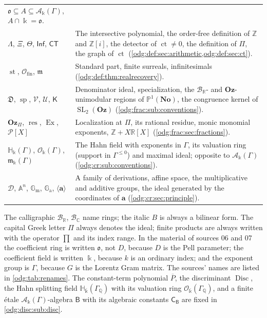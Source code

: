 \documentclass[11pt,oneside]{article}
\numberwithin{equation}{section}
\theoremstyle{definition}
\theoremstyle{remark}
\newcommand{\No}{\mathbf{No}}
\newcommand{\Oz}{\mathbf{Oz}}
\newcommand{\Z}{\mathbb Z}
\newcommand{\Q}{\mathbb Q}
\newcommand{\R}{\mathbb R}
\newcommand{\C}{\mathbb C}
\newcommand{\BR}{\mathcal B_{\R}}
\newcommand{\BC}{\mathcal B_{\C}}
\newcommand{\ct}{\operatorname{ct}}
\newcommand{\SL}{\operatorname{SL}}
\newcommand{\st}{\operatorname{st}}
\newcommand{\Ofin}{\mathcal O_{\mathrm{fin}}}
\newcommand{\Den}{\mathfrak D}
\newcommand{\spz}{\operatorname{sp}}
\newcommand{\res}{\operatorname{res}}
\newcommand{\Ex}{\operatorname{Ex}}
\newcommand{\Vreg}{\mathcal V}
\newcommand{\Ureg}{\mathcal U}
\newcommand{\Kcong}{\mathsf K}
\newcommand{\Pmod}{\mathcal P}
\newcommand{\crH}{\mathbb H_\Bbbk(\Gamma)}
\newcommand{\crA}{\mathcal A_\Bbbk(\Gamma)}
\newcommand{\crO}{\mathcal O_\Bbbk(\Gamma)}
\newcommand{\crm}{\mathfrak m_\Bbbk(\Gamma)}
\newcommand{\Aff}{\mathbb A}
\newcommand{\Gm}{\mathbb G_{\mathrm m}}
\newcommand{\Ga}{\mathbb G_{\mathrm a}}
\newcommand{\Disc}{\operatorname{Disc}}
\newcommand{\Hbar}{\mathbb H_{\bar\Bbbk}(\Gamma_\Q)}
\newcommand{\Obar}{\mathcal O_{\bar\Bbbk}(\Gamma_\Q)}
\begin{document}
\begin{center}
\begin{tabular}{>{\raggedright\arraybackslash}p{}>{\raggedright\arraybackslash}p{}}
$\mathfrak o\subseteq A\subseteq\mathcal A_\Bbbk(\Gamma)$, $A\cap\Bbbk=\mathfrak o$.\\
$\Lambda$, $\Xi$, $\Theta$, $\mathsf{Inf}$, $\mathsf{CT}$ & The intersective
polynomial, the order-free definition of $\Z$ and $\Z[i]$, the detector of
$\ct\ne0$, the definition of $\Pi$, the graph of $\ct$
(\cref{odg:def:sec:arithmetic,odg:def:sec:ct}).\\
$\st$, $\Ofin$, $\mathfrak m$ & Standard part, finite surreals, infinitesimals
(\cref{odg:def:thm:realrecovery}).\\
$\Den$, $\spz$, $\Vreg$, $\Ureg$, $\Kcong$ & Denominator ideal, specialization,
the $\BR$- and $\Oz$-unimodular regions of $\mathbb P^1(\No)$, the congruence
kernel of $\SL_2(\Oz)$ (\cref{odg:frac:sub:conventions}).\\
$\Oz_\Pi$, $\res$, $\Ex$, $\Pmod[X]$ & Localization at $\Pi$, its rational
residue, monic monomial exponents, $\Z+X\R[X]$ (\cref{odg:frac:sec:fractions}).\\
$\crH$, $\crO$, $\crm$ & The Hahn field with exponents in $\Gamma$, its valuation
ring (support in $\Gamma^{\le0}$) and maximal ideal; opposite to $\crA$
(\cref{odg:cr:sub:conventions}).\\
$\mathcal D$, $\Aff^n$, $\Gm$, $\Ga$, $\langle\mathbf a\rangle$ & A family of
derivations, affine space, the multiplicative and additive groups, the ideal generated
by the coordinates of $\mathbf a$ (\cref{odg:cr:sec:principle}).\\
\bottomrule
\end{tabular}
\end{center}

The calligraphic $\BR$, $\BC$ name rings; the italic $B$ is always a bilinear
form. The capital Greek letter $\Pi$ always denotes the ideal; finite products
are always written with the operator $\prod$ and its index range. In the
material of sources 06 and 07 the coefficient ring is written $\mathfrak o$,
not $D$, because $D$ is the Pell parameter; the coefficient field is written
$\Bbbk$, because $k$ is an ordinary index; and the exponent group is $\Gamma$,
because $G$ is the Lorentz Gram matrix. The sources' names are listed in
\cref{odg:tab:renames}.
The constant-term polynomial $\overline P$, the discriminant $\Disc$, the Hahn splitting
field $\Hbar$ with its valuation ring $\Obar$, and a finite \'etale $\crA$-algebra
$\mathsf B$ with its algebraic constants $\mathsf C_{\mathsf B}$ are fixed in
\cref{odg:disc:sub:disc}.
\end{document}
